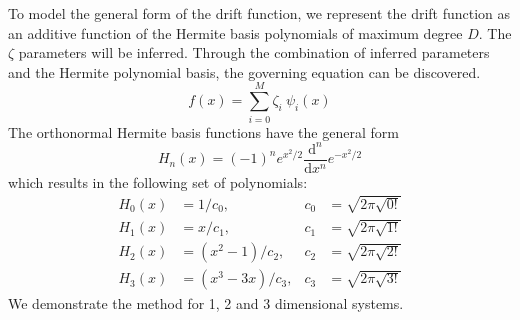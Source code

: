 \documentclass{article}
\begin{document}
To model the general form of the drift function, we represent the drift function as an additive function of the Hermite basis polynomials of maximum degree $D$. The $\zeta$ parameters will be inferred. Through the combination of inferred parameters and the Hermite polynomial basis, the governing equation can be discovered.
\begin{equation}
f(x) = \sum_{i = 0}^{M} \zeta_i \: \psi_i(x)
\end{equation}
The orthonormal Hermite basis functions have the general form
\begin{equation}
H_n(x) = (-1)^n e^{x^2/2} \dfrac{\mathrm{d}^n}{\mathrm{d}x^n} e^{-x^2/2}
\end{equation}
which results in the following set of polynomials:
\begin{align*}
H_0(x) & = 1 / c_0, & c_0 & = \sqrt{2 \pi \sqrt{0!}} \\
H_1(x) & = x / c_1, & c_1 & = \sqrt{2 \pi \sqrt{1!}} \\
H_2(x) & = (x^2 - 1) / c_2, & c_2 & = \sqrt{2 \pi \sqrt{2!}} \\
H_3(x) & = (x^3 - 3x) / c_3, & c_3 & = \sqrt{2 \pi \sqrt{3!}}
\end{align*}
We demonstrate the method for 1, 2 and 3 dimensional systems. 
\end{document}
